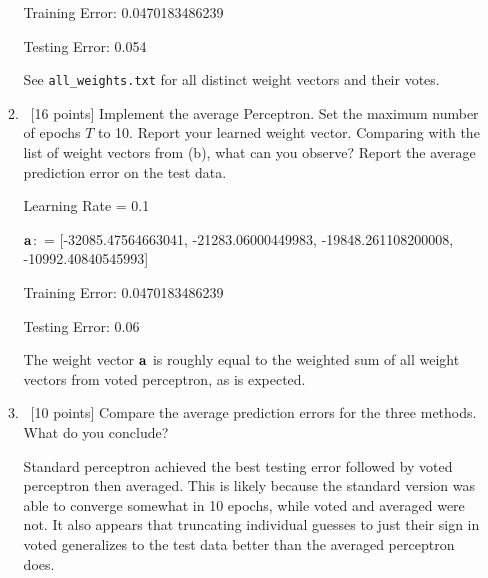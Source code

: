 \documentclass[12pt, fullpage,letterpaper]{article}
\begin{document}
\begin{enumerate}
\begin{enumerate}
	Training Error: 0.0470183486239
	
	Testing Error: 0.054
	
	
	See \texttt{all\_weights.txt} for all distinct weight vectors and their votes.
	\bigskip
	 
	\item~[16 points] Implement the average Perceptron. Set the maximum number of epochs $T$ to 10. Report your learned weight vector. Comparing with the list of weight vectors from (b), what can you observe? Report the average prediction error on the test data. 
	
	\bigskip
	Learning Rate = 0.1
	
	${\bf a}$:\ = [-32085.47564663041, -21283.06000449983, -19848.261108200008, -10992.40840545993]
	
	Training Error: 0.0470183486239
	
	Testing Error: 0.06
	\bigskip
	
	The weight vector ${\bf a}$ is roughly equal to the weighted sum of all weight vectors from voted perceptron, as is expected.
	
	\bigskip
	
	\item~[10 points] Compare the average prediction errors for the three methods. What do you conclude? 
	
	\bigskip
	Standard perceptron achieved the best testing error followed by voted perceptron then averaged. This is likely because the standard version was able to converge somewhat in 10 epochs, while voted and averaged were not. It also appears that truncating individual guesses to just their sign in voted generalizes to the test data better than the averaged perceptron does.
	
\end{enumerate}


\end{enumerate}
\end{document}
